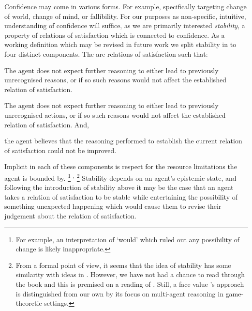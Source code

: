 \documentclass[10pt]{article}
\begin{document}
Confidence may come in various forms.
For example, specifically targeting change of world, change of mind, or fallibility.
For our purposes as non-specific, intuitive, understanding of confidence will suffice, as we are primarily interested \emph{stability}, a property of relations of satisfaction which is connected to confidence.
As a working definition which may be revised in future work we split stability in to four distinct components.
The are relations of satisfaction such that:
\begin{enumerate*}[label=(\arabic*)]
\item The agent does not expect further reasoning to either lead to previously unrecognised reasons, or if so such reasons would not affect the established relation of satisfaction.
\item The agent does not expect further reasoning to either lead to previously unrecognised actions, or if so such reasons would not affect the established relation of satisfaction.
  And,
\item the agent believes that the reasoning performed to establish the current relation of satisfaction could not be improved.
\end{enumerate*}
Implicit in each of these components is respect for the resource limitations the agent is bounded by.\nolinebreak
\footnote{For example, an interpretation of `would' which ruled out any possibility of change is likely inappropriate.}\nolinebreak
\(^{,}\)\nolinebreak
\footnote{From a formal point of view, it seems that the idea of stability has some similarity with ideas in \textcite{Skyrms:1990aa}.
  However, we have not had a chance to read through the book and this is premised on a reading of \textcite{Pacuit:2015aa}.
  Still, a face value \citeauthor{Skyrms:1990aa}'s approach is distinguished from our own by its focus on multi-agent reasoning in game-theoretic settings.}
Stability depends on an agent's epistemic state, and following the introduction of stability above it may be the case that an agent takes a relation of satisfaction to be stable while entertaining the possibility of something unexpected happening which would cause them to revise their judgement about the relation of satisfaction.
\end{document}
